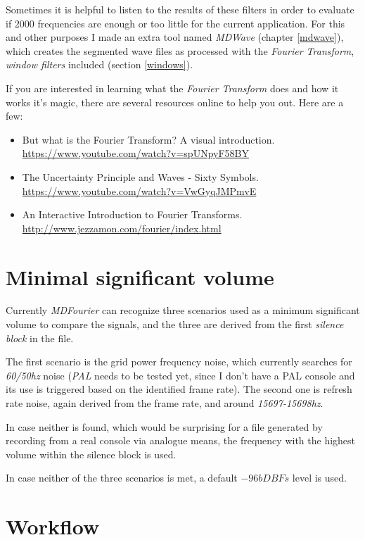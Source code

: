 \documentclass[10pt,a4paper]{report}
\begin{document}
Sometimes it is helpful to listen to the results of these filters in order to evaluate if 2000 frequencies are enough or too little for the current application. For this and other purposes I made an extra tool named \textit{MDWave} (chapter \ref{mdwave}), which creates the segmented wave files as processed with the \textit{Fourier Transform}, \textit{window filters} included (section \ref{windows}).

If you are interested in learning what the \textit{Fourier Transform} does and how it works it's magic, there are several resources online to help you out. Here are a few:

\begin{itemize}
	\item But what is the Fourier Transform? A visual introduction.  \url{https://www.youtube.com/watch?v=spUNpyF58BY}
	\item The Uncertainty Principle and Waves - Sixty Symbols.  \url{https://www.youtube.com/watch?v=VwGyqJMPmvE}
	\item An Interactive Introduction to Fourier Transforms.  \url{http://www.jezzamon.com/fourier/index.html}
\end{itemize}


\section{Minimal significant volume}
\label{MinSigVolume}

Currently \textit{MDFourier} can recognize three scenarios used as a minimum significant volume to compare the signals, and the three are derived from the first \textit{silence block} in the file.

The first scenario is the grid power frequency noise, which currently searches for \textit{60/50hz} noise (\textit{PAL} needs to be tested yet, since I don't have a PAL console and its use is triggered based on the identified frame rate). The second one is refresh rate noise, again derived from the frame rate, and around \textit{15697-15698hz}. 

In case neither is found, which would be surprising for a file generated by recording from a real console via analogue means, the frequency with the highest volume within the silence block is used. 

In case neither of the three scenarios is met, a default $-96bDBFs$ level is used.


\section{Workflow}
\end{document}
